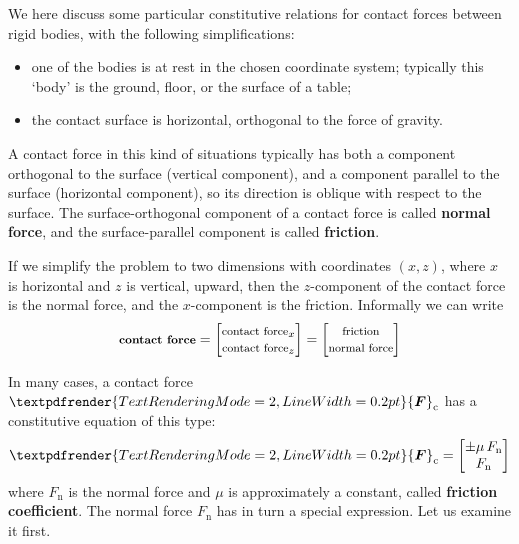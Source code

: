 \documentclass[a4paper,12pt,%
onecolumn,oneside,%
british%
]{memoir}
\renewcommand*{\bm}[1]{\textpdfrender{TextRenderingMode=2,LineWidth=0.2pt}{\boldsymbol{#1}}}
\renewcommand*{\|}[1][]{\nonscript\:#1\vert\nonscript\:\mathopen{}}
\newcommand*{\yfri}{\mu} %
\newcommand*{\yF}{\bm{F}}
\newcommand*{\yFc}{\yF_{\textrm{c}}}
\newcommand*{\yFn}{F_{\textrm{n}}}
\begin{document}
We here discuss some particular constitutive relations for contact forces between rigid bodies, with the following simplifications:
\begin{itemize}[nosep]
\item one of the bodies is at rest in the chosen coordinate system; typically this \enquote*{body} is the ground, floor, or the surface of a table;
\item the contact surface is horizontal, orthogonal to the force of gravity.
\end{itemize}

A contact force in this kind of situations typically has both a component orthogonal to the surface (vertical component), and a component parallel to the surface (horizontal component), so its direction is oblique with respect to the surface. The surface-orthogonal component of a contact force is called \textbf{normal force}, and the surface-parallel component is called \textbf{friction}.

If we simplify the problem to two dimensions with coordinates $(x,z)$, where $x$ is horizontal and $z$ is vertical, upward, then the $z$-component of the contact force is the normal force, and the $x$-component is the friction. Informally we can write
\begin{equation*}
  \textbf{\footnotesize contact force}
  =
  \begin{bmatrix}
    \text{\footnotesize contact force}_{x}
    \\
    \text{\footnotesize contact force}_{z}
  \end{bmatrix}
  =
  \begin{bmatrix}
    \text{\footnotesize friction}
    \\
    \text{\footnotesize normal force}
  \end{bmatrix}
\end{equation*}

In many cases, a contact force $\yFc$ has a constitutive equation of this type:
\begin{equation}\label{eq:contact_force_2D}
  \yFc =
  \begin{bmatrix}
    \pm\yfri\, \yFn \\
    \yFn
  \end{bmatrix}
\end{equation}
where $\yFn$ is the normal force and $\yfri$ is approximately a constant, called \textbf{friction coefficient}. The normal force $\yFn$ has in turn a special expression. Let us examine it first.
\end{document}
